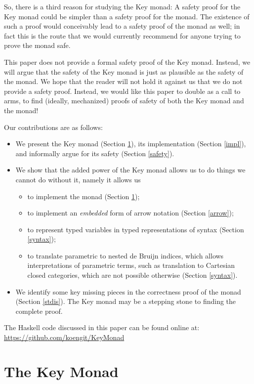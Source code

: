 \documentclass{sigplanconf}
\begin{document}
So, there is a third reason for studying the Key monad: A safety proof for the Key monad could be simpler than a safety proof for the \st{} monad. The existence of such a proof would conceivably lead to a safety proof of the \st{} monad as well; in fact this is the route that we would currently recommend for anyone trying to prove the \st{} monad safe.

This paper does not provide a formal safety proof of the Key monad. Instead, we will argue that the safety of the Key monad is just as plausible as the safety of the \st{} monad. We hope that the reader will not hold it against us that we do not provide a safety proof. Instead, we would like this paper to double as a call to arms, to find (ideally, mechanized) proofs of safety of both the Key monad and the \st{} monad!

Our contributions are as follows:
\begin{itemize}
\item We present the Key monad (Section \ref{keym}), its implementation (Section \ref{impl}), and informally argue for its safety (Section \ref{safety}).
\item We show that the added power of the Key monad allows us to do things we cannot do without it, namely it allows us
     \begin{itemize}
          \item to implement the \st{} monad (Section \ref{keym});
          \item to implement an \emph{embedded} form of arrow notation (Section \ref{arrow});
          \item to represent typed variables in typed representations of syntax (Section \ref{syntax});
          \item to translate parametric \hoas{} to nested de Bruijn indices, which allows interpretations of parametric \hoas{} terms, such as translation to Cartesian closed categories, which are not possible otherwise (Section \ref{syntax}).
\end{itemize}
\item We identify some key missing pieces in the correctness proof of the \st{} monad (Section \ref{stdis}). The Key monad may be a stepping stone to finding the complete proof.
\end{itemize}

\noindent The Haskell code discussed in this paper can be found online at: 
\url{https://github.com/koengit/KeyMonad}

\section{The Key Monad}
\label{keym}
\end{document}
